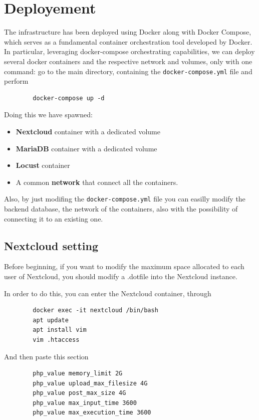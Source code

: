 \documentclass{article}
\begin{document}
	\section{Deployement}
	The infrastructure has been deployed using Docker along with Docker Compose, which serves as a fundamental container orchestration tool developed by Docker. %
	In particular, leveraging docker-compose orchestrating capabilities, we can deploy several docker containers and the respective network and volumes, only with one command: go to the main directory, containing the \verb|docker-compose.yml| file and perform
	
	\begin{verbatim}
		docker-compose up -d
	\end{verbatim}
	
	Doing this we have spawned:
	\begin{itemize}
		\item \textbf{Nextcloud} container with a dedicated volume
		\item \textbf{MariaDB} container with a dedicated volume
		\item \textbf{Locust} container
		\item A common \textbf{network} that connect all the containers.
	\end{itemize}
	
	Also, by just modifing the \verb|docker-compose.yml| file you can easilly modify the backend database, the network of the containers, also with the possibility of connecting it to an existing one.
	
	\subsection{Nextcloud setting}
	Before beginning, if you want to modify the maximum space allocated to each user of Nextcloud, you should modify a .dotfile into the Nextcloud instance.
	
	In order to do this, you can enter the Nextcloud container, through
	\begin{verbatim}
		docker exec -it nextcloud /bin/bash
		apt update
		apt install vim
		vim .htaccess
	\end{verbatim}
	And then paste this section
	\begin{verbatim}
		php_value memory_limit 2G
		php_value upload_max_filesize 4G
		php_value post_max_size 4G
		php_value max_input_time 3600
		php_value max_execution_time 3600
	\end{verbatim}
	
\end{document}

